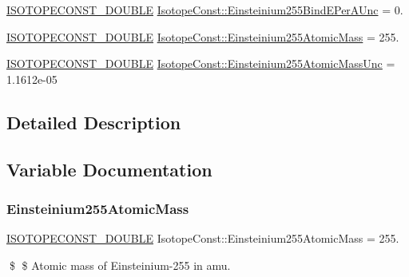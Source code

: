 \begin{DoxyCompactItemize}
\item 
\mbox{\hyperlink{group___isotope_const-_macros_ga8f45a7272ce02c0b4c65c44636ed719a}{I\+S\+O\+T\+O\+P\+E\+C\+O\+N\+S\+T\+\_\+\+D\+O\+U\+B\+LE}} \mbox{\hyperlink{group___isotope_const-_einsteinium-_es255_ga3b3e636d82caf2f518130e9a9b3aeeb0}{Isotope\+Const\+::\+Einsteinium255\+Bind\+E\+Per\+A\+Unc}} = 0.
\item 
\mbox{\hyperlink{group___isotope_const-_macros_ga8f45a7272ce02c0b4c65c44636ed719a}{I\+S\+O\+T\+O\+P\+E\+C\+O\+N\+S\+T\+\_\+\+D\+O\+U\+B\+LE}} \mbox{\hyperlink{group___isotope_const-_einsteinium-_es255_gae35607d8415bb5b52909f29259841d12}{Isotope\+Const\+::\+Einsteinium255\+Atomic\+Mass}} = 255.
\item 
\mbox{\hyperlink{group___isotope_const-_macros_ga8f45a7272ce02c0b4c65c44636ed719a}{I\+S\+O\+T\+O\+P\+E\+C\+O\+N\+S\+T\+\_\+\+D\+O\+U\+B\+LE}} \mbox{\hyperlink{group___isotope_const-_einsteinium-_es255_ga76a3db1415feadb1bbf03a7f63264af8}{Isotope\+Const\+::\+Einsteinium255\+Atomic\+Mass\+Unc}} = 1.\+1612e-\/05
\end{DoxyCompactItemize}


\subsection{Detailed Description}


\subsection{Variable Documentation}
\mbox{\label{group___isotope_const-_einsteinium-_es255_gae35607d8415bb5b52909f29259841d12}} 
\subsubsection{\texorpdfstring{Einsteinium255\+Atomic\+Mass}{Einsteinium255AtomicMass}}
{\footnotesize\ttfamily \mbox{\hyperlink{group___isotope_const-_macros_ga8f45a7272ce02c0b4c65c44636ed719a}{I\+S\+O\+T\+O\+P\+E\+C\+O\+N\+S\+T\+\_\+\+D\+O\+U\+B\+LE}} Isotope\+Const\+::\+Einsteinium255\+Atomic\+Mass = 255.}

\$ \$ Atomic mass of Einsteinium-\/255 in amu. \mbox{\label{group___isotope_const-_einsteinium-_es255_ga76a3db1415feadb1bbf03a7f63264af8}} 
